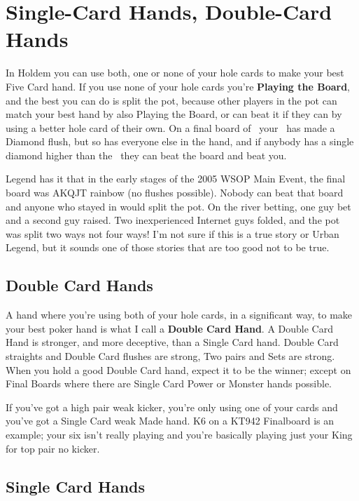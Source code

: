 \chapter{Single-Card Hands, Double-Card Hands}


In Holdem you can use both, one or none of your hole cards to make your
best Five Card hand. If you use none of your hole cards you're
\textbf{Playing the Board}, and the best you can do is split the
pot, because other players in the pot can match your best hand by also
Playing the Board, or can beat it if they can by using a better hole
card of their own. On a final board of \Ad\nined\eigd\Jd\sixd\ your
\Qc\Qs\ has made a Diamond flush, but so has everyone else in the hand,
and if anybody has a single diamond higher than the \sixd\ they can
beat the board and beat you.

Legend has it that in the early stages of the 2005 WSOP Main Event,
the final board was AKQJT rainbow (no flushes possible). Nobody can
beat that board and anyone who stayed in would split the pot. On the
river betting, one guy bet and a second guy raised. Two inexperienced
Internet guys folded, and the pot was split two ways not four ways!
I'm not sure if this is a true story or Urban Legend, but it sounds
one of those stories that are too good not to be true.

\section{Double Card Hands}

A hand where you're using both of your hole cards, in a significant
way, to make your best poker hand is what I call a \textbf{Double Card
Hand}. A Double Card Hand is stronger, and more deceptive, than a
Single Card hand. Double Card straights and Double Card flushes are
strong, Two pairs and Sets are strong. When you hold a good Double
Card hand, expect it to be the winner; except on Final Boards where
there are Single Card Power or Monster hands possible.

If you've got a high pair weak kicker, you're only using one of your
cards and you've got a Single Card weak Made hand. K6 on a KT942
Finalboard is an example; your six isn't really playing and you're
basically playing just your King for top pair no kicker.

\section{Single Card Hands}

